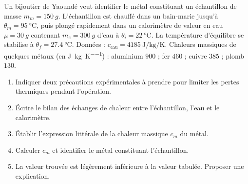 \documentclass[11pt]{article}
\begin{document}
\begin{exercice}
Un bijoutier de Yaoundé veut identifier le métal constituant un échantillon de masse $m_m = \SI{150}{g}$. L'échantillon est chauffé dans un bain-marie jusqu'à $\theta_m = \SI{95}{\celsius}$, puis plongé rapidement dans un calorimètre de valeur en eau $\mu = \SI{30}{g}$ contenant $m_e = \SI{300}{g}$ d'eau à $\theta_i = \SI{22}{\celsius}$. La température d'équilibre se stabilise à $\theta_f = \SI{27,4}{\celsius}$.
Données : $c_{\text{eau}} = \SI{4185}{\joule\per\kilogram\per\kelvin}$. Chaleurs massiques de quelques métaux (en \si{\joule\per\kilogram\per\kelvin}) : aluminium $900$ ; fer $460$ ; cuivre $385$ ; plomb $130$.
\begin{enumerate}
\item Indiquer deux précautions expérimentales à prendre pour limiter les pertes thermiques pendant l'opération.
\item Écrire le bilan des échanges de chaleur entre l'échantillon, l'eau et le calorimètre.
\item Établir l'expression littérale de la chaleur massique $c_m$ du métal.
\item Calculer $c_m$ et identifier le métal constituant l'échantillon.
\item La valeur trouvée est légèrement inférieure à la valeur tabulée. Proposer une explication.
\end{enumerate}
\end{exercice}
\end{document}
